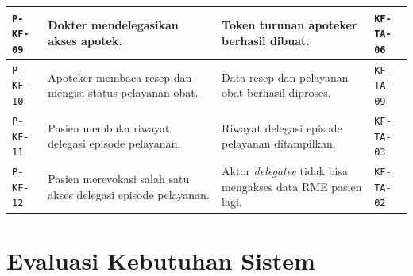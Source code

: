 \begin{longtable}{|p{}|p{}|p{}|p{}|}
	\texttt{P-KF-09}                                                                   &
	Dokter mendelegasikan akses apotek.                                                &
	Token turunan apoteker berhasil dibuat.                                            &
	\texttt{KF-TA-06}                                                                                                                          \\ \hline

	\texttt{P-KF-10}                                                                   &
	Apoteker membaca resep dan mengisi status pelayanan obat.                          &
	Data resep dan pelayanan obat berhasil diproses.                                   &
	\texttt{KF-TA-09}                                                                                                                          \\ \hline

	\texttt{P-KF-11}                                                                   &
	Pasien membuka riwayat delegasi episode pelayanan.                                 &
	Riwayat delegasi episode pelayanan ditampilkan.                                    &
	\texttt{KF-TA-03}                                                                                                                          \\ \hline
	\texttt{P-KF-12}                                                                   &
	Pasien merevokasi salah satu akses delegasi episode pelayanan.                     &
	Aktor \textit{delegatee} tidak bisa mengakses data RME pasien lagi.                &
	\texttt{KF-TA-02}                                                                                                                          \\ \hline
\end{longtable}
\endgroup

\section{Evaluasi Kebutuhan Sistem}

